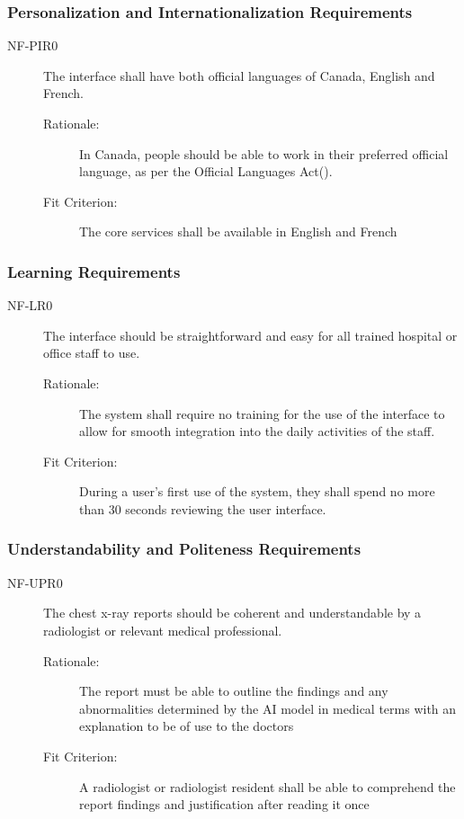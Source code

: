 \documentclass[12pt]{article}
\begin{document}
\subsubsection{Personalization and Internationalization Requirements}
\begin{description}
    \item[NF-PIR0] The interface shall have both official languages of Canada, English and French.
    \begin{description}
        \item[Rationale:] In Canada, people should be able to work in their preferred official language, as per the Official Languages Act(\cite{OLA}).
        \item[Fit Criterion:] The core services shall be available in English and French
    \end{description}
\end{description}

\subsubsection{Learning Requirements}
\begin{description}
    \item[NF-LR0] The interface should be straightforward and easy for all trained hospital or office staff to use.  
    \begin{description}
        \item[Rationale:] The system shall require no training for the use of the interface to allow for smooth integration into the daily activities of the staff.
        \item[Fit Criterion:] During a user's first use of the system, they shall spend no more than 30 seconds reviewing the user interface.
    \end{description}
\end{description}


\subsubsection{Understandability and Politeness Requirements}
\begin{description}
    \item[NF-UPR0] The chest x-ray reports should be coherent and understandable by a radiologist or relevant medical professional. 
    \begin{description}
        \item[Rationale:] The report must be able to outline the findings and any abnormalities determined by the AI model in medical terms with an explanation to be of use to the doctors
        \item[Fit Criterion:] A radiologist or radiologist resident shall be able to comprehend the report findings and justification after reading it once
    \end{description}
\end{description}
\end{document}
